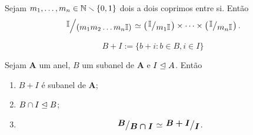 \begin{proposition}
	Sejam $m_1,\ldots,m_n \in \mathbb{N}\smallsetminus\{0,1\}$ dois a dois coprimos entre si. Então
	\begin{equation*}
	\quo{\Z}{\left(m_1m_2\ldots m_n\Z\right)} \simeq \left(\quo{\Z}{m_1\Z}\right) \times \cdots \times \left(\quo{\Z}{m_n\Z}\right).
	\end{equation*}
\end{proposition}

\begin{definition}
	\begin{equation*}
	B+I := \{b+i : b \in B, i \in I\}
	\end{equation*}
\end{definition}

\begin{theorem}
	Sejam $\bm A$ um anel, $B$ um subanel de $\bm A$ e $I \mathrel{\unlhd} A$. Então
	\begin{enumerate}
	\item $B+I$ é subanel de $\bm A$;
	\item $B \cap I \mathrel{\unlhd} B$;
	\item
	\begin{equation*}
	\bm{\quo{B}{B \cap I}} \simeq \bm{\quo{B+I}{I}}.
	\end{equation*}
	\end{enumerate}
\end{theorem}
